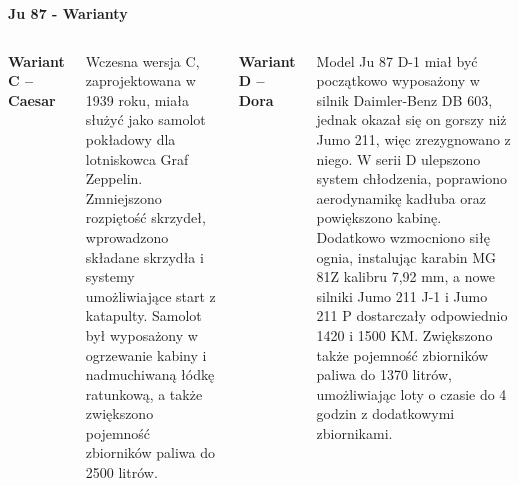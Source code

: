 \begin{frame}[t]{\Huge{\textbf{Ju 87 - Warianty}}}
	\begin{columns}[t]

{\large{\textbf{Wariant C – Caesar}}}	\\~\
	\justifying

Wczesna wersja C, zaprojektowana w 1939 roku, miała służyć jako samolot pokładowy dla lotniskowca Graf Zeppelin. Zmniejszono rozpiętość skrzydeł, wprowadzono składane skrzydła i systemy umożliwiające start z katapulty. Samolot był wyposażony w ogrzewanie kabiny i nadmuchiwaną łódkę ratunkową, a także zwiększono pojemność zbiorników paliwa do 2500 litrów.

		
{\large{\textbf{Wariant D – Dora}}}	\\~\
	\justifying

Model Ju 87 D-1 miał być początkowo wyposażony w silnik Daimler-Benz DB 603, jednak okazał się on gorszy niż Jumo 211, więc zrezygnowano z niego. W serii D ulepszono system chłodzenia, poprawiono aerodynamikę kadłuba oraz powiększono kabinę. Dodatkowo wzmocniono siłę ognia, instalując karabin MG 81Z kalibru 7,92 mm, a nowe silniki Jumo 211 J-1 i Jumo 211 P dostarczały odpowiednio 1420 i 1500 KM. Zwiększono także pojemność zbiorników paliwa do 1370 litrów, umożliwiając loty o czasie do 4 godzin z dodatkowymi zbiornikami.

	\end{columns}
\end{frame}



